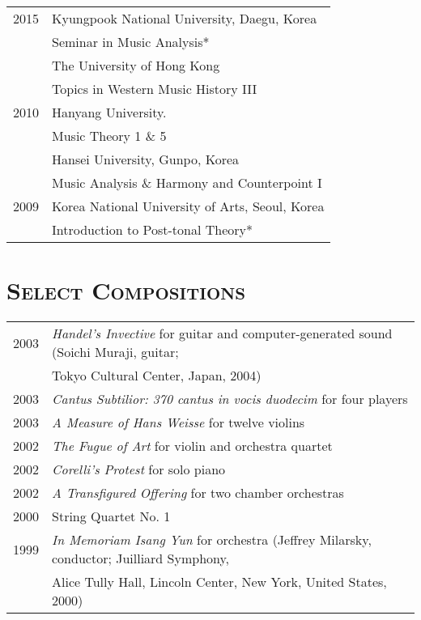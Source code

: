 \documentclass[a4paper,11pt]{article}
\begin{document}
\begin{tabular}{p{2.5cm} l}
    2015 & Kyungpook National University, Daegu, Korea\\
    & Seminar in Music Analysis*\\[1mm]
    
    & The University of Hong Kong\\
    & Topics in Western Music History III\\[1mm]
    
    2010 & Hanyang University.\\
    & Music Theory 1 \& 5\\[1mm]
    
    & Hansei University, Gunpo, Korea\\
    & Music Analysis \& Harmony and Counterpoint I\\[1mm]
    
    2009 & Korea National University of Arts, Seoul, Korea\\
    & Introduction to Post-tonal Theory*\\
  \end{tabular}
  
  \vspace{2.5mm}
  
  \section*{\textsc{Select Compositions}}
  
  \hspace*{-0.25cm}
  \begin{tabular}{p{2.5cm} p{12.5cm}}
    2003 & \textit{Handel’s Invective} for guitar and computer-generated sound
    (Soichi Muraji, guitar;\\
    & Tokyo Cultural Center, Japan, 2004)\\[2mm]
    
    2003 & \textit{Cantus Subtilior: 370 cantus in vocis duodecim} for four
    players\\[2mm]
    
    2003 & \textit{A Measure of Hans Weisse} for twelve violins\\[2mm]
    
    2002 & \textit{The Fugue of Art} for violin and orchestra quartet\\[2mm]
    
    2002 & \textit{Corelli’s Protest} for solo piano\\[2mm]
    
    2002 & \textit{A Transfigured Offering} for two chamber orchestras\\[2mm]
    
    2000 & String Quartet No. 1\\[2mm]
    
    1999 & \textit{In Memoriam Isang Yun} for orchestra (Jeffrey Milarsky,
    conductor; Juilliard Symphony,\\
    & Alice Tully Hall, Lincoln Center, New York, United States, 2000)
  \end{tabular}
  
\end{document}
